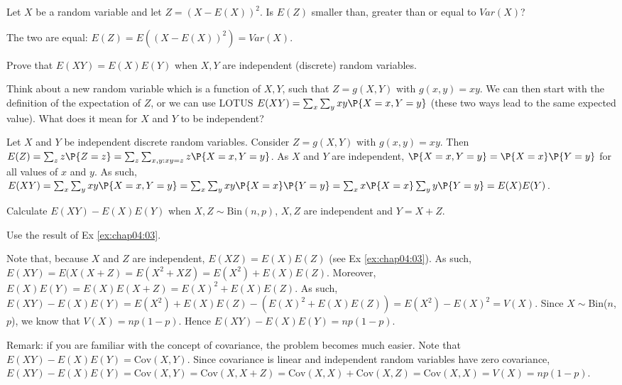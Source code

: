 \begin{exercise}
	Let $X$ be a random variable and let $Z=(X-E(X))^2$. Is $E(Z)$ smaller than, greater than or equal to $Var(X)$?
	\begin{solution}
		The two are equal: $E(Z) = E((X-E(X))^2) = Var(X)$.
	\end{solution}
\end{exercise}

\begin{exercise}\label{ex:chap04:03} 
	Prove that $E(XY) = E(X)E(Y)$ when $X,Y$ are independent (discrete) random variables.
	\begin{hint}
		Think about a new random variable which is a function of $X,Y$, such that $Z=g(X,Y)$ with $g(x,y)=xy$. We can then start with the definition of the expectation of $Z$, or we can use LOTUS $E(XY) = \sum_x \sum_y xy \P{X = x, Y = y}$ (these two ways lead to the same expected value). What does it mean for $X$ and $Y$ to be independent? 
	\end{hint}
	\begin{solution}
		Let $X$ and $Y$ be independent discrete random variables. Consider  $Z=g(X,Y)$ with $g(x,y)=xy$. Then $E(Z) = \sum_z z \P{Z = z}=\sum_z \sum_{x,y:xy=z} z \P{X = x, Y=y}$. As $X$ and $Y$ are independent, $\P{X = x, Y = y} = \P{X = x}\P{Y = y}$ for all values of $x$ and $y$. As such, $E(XY) = \sum_x \sum_y xy \P{X = x, Y = y} = \sum_x \sum_y xy \P{X = x} \P{Y = y} = \sum_x x \P{X = x} \sum_y y \P{Y = y} = E(X) E(Y)$.
	\end{solution}
\end{exercise}

\begin{exercise}\label{Exref{ex:chap04:03}}
	Calculate $E(XY) - E(X)E(Y)$ when $X,Z\sim \text{Bin}(n, p)$, $X,Z$ are independent and $Y = X + Z$.
	\begin{hint}
		Use the result of Ex \ref{ex:chap04:03}. 
	\end{hint}
	\begin{solution}
		Note that, because $X$ and $Z$ are independent, $E(XZ) = E(X) E(Z)$ (see Ex \ref{ex:chap04:03}). As such, $E(XY) = E(X(X + Z) = E(X^2 + XZ) = E(X^2) + E(X) E(Z)$. Moreover, $E(X)E(Y) = E(X) E(X + Z) = E(X)^2 + E(X) E(Z)$. As such, $E(XY) - E(X)E(Y) = E(X^2) + E(X) E(Z) - (E(X)^2 + E(X) E(Z)) = E(X^2) - E(X)^2 = V(X)$. Since $X\sim$Bin($n$,$p$), we know that $V(X) = np(1 - p)$. Hence $E(XY) - E(X)E(Y) = np(1 - p)$.
	
		Remark: if you are familiar with the concept of covariance, the problem becomes much easier. Note that $E(XY) - E(X)E(Y) = \text{Cov}(X,Y)$. Since covariance is linear and independent random variables have zero covariance, $E(XY) - E(X)E(Y) = \text{Cov}(X,Y) = \text{Cov}(X,X+Z) = \text{Cov}(X,X) + \text{Cov}(X,Z) = \text{Cov}(X,X) = V(X) = np(1 - p)$.
	\end{solution}
\end{exercise}


